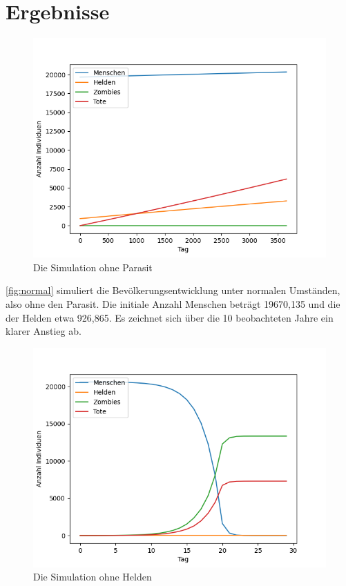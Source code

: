 \section{Ergebnisse} %
    \label{sec:ergebnisse}
    \begin{figure}[h]
        \centering
        \includegraphics[width=1\textwidth]{normal.png}
        \caption{Die Simulation ohne Parasit}
        \label{fig:normal}
    \end{figure}
    \autoref{fig:normal} simuliert die Bevölkerungsentwicklung unter normalen Umständen, also ohne den Parasit. Die initiale Anzahl Menschen beträgt 19670,135 und die der Helden etwa 926,865. Es zeichnet sich über die 10 beobachteten Jahre ein klarer Anstieg ab.
    \newpage
    \begin{figure}[h]
        \centering
        \includegraphics[width=1\textwidth]{zombified_no_heroes.png}
        \caption{Die Simulation ohne Helden}
        \label{fig:no_heroes}
    \end{figure}
